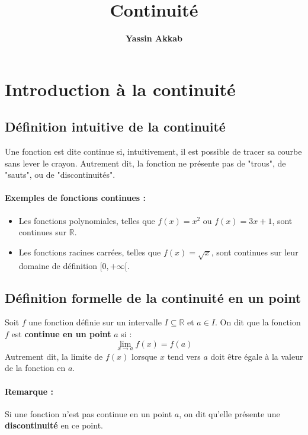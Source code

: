 \documentclass{article}
\title{\textbf{Continuité}}
\author{\textbf{Yassin Akkab}}
\begin{document}
	
	\maketitle
	
	
	
	\tableofcontents
	
	\newpage
	
	\section{Introduction à la continuité}
	
	\subsection{Définition intuitive de la continuité}
	
	Une fonction est dite continue si, intuitivement, il est possible de tracer sa courbe sans lever le crayon. Autrement dit, la fonction ne présente pas de "trous", de "sauts", ou de "discontinuités".
	
	\paragraph{Exemples de fonctions continues :}
	\begin{itemize}
		\item Les fonctions polynomiales, telles que \( f(x) = x^2 \) ou \( f(x) = 3x + 1 \), sont continues sur \( \mathbb{R} \).
		\item Les fonctions racines carrées, telles que \( f(x) = \sqrt{x} \), sont continues sur leur domaine de définition \( [0, +\infty[ \).
	\end{itemize}
	
	\subsection{Définition formelle de la continuité en un point}
	
	Soit \( f \) une fonction définie sur un intervalle \( I \subseteq \mathbb{R} \) et \( a \in I \). On dit que la fonction \( f \) est \textbf{continue en un point} \( a \) si :
	\[
	\lim_{x \to a} f(x) = f(a)
	\]
	Autrement dit, la limite de \( f(x) \) lorsque \( x \) tend vers \( a \) doit être égale à la valeur de la fonction en \( a \).
	
	\paragraph{Remarque :} Si une fonction n'est pas continue en un point \( a \), on dit qu'elle présente une \textbf{discontinuité} en ce point.
	
\end{document}

